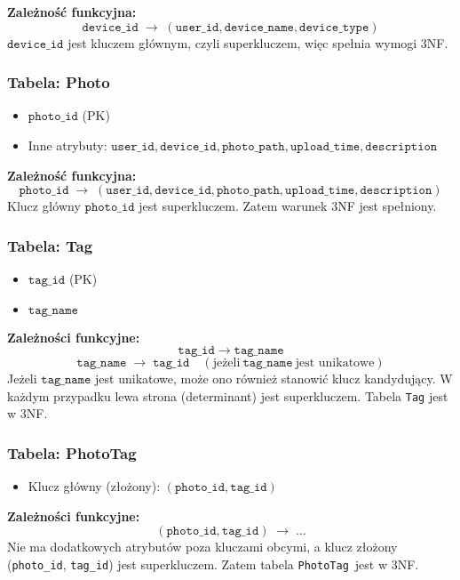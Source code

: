 \documentclass[12pt,a4paper]{article}
\begin{document}
\noindent \textbf{Zależność funkcyjna:}
\[
\texttt{device\_id} \;\rightarrow\; (\texttt{user\_id}, \texttt{device\_name}, \texttt{device\_type})
\]
\(\texttt{device\_id}\) jest kluczem głównym, czyli superkluczem, więc spełnia wymogi 3NF.

\subsubsection{Tabela: Photo}
\begin{itemize}
    \item \(\texttt{photo\_id}\) (PK)
    \item Inne atrybuty: \(\texttt{user\_id}, \texttt{device\_id}, \texttt{photo\_path}, \texttt{upload\_time}, \texttt{description}\)
\end{itemize}

\noindent \textbf{Zależność funkcyjna:}
\[
\texttt{photo\_id} \;\rightarrow\; (\texttt{user\_id}, \texttt{device\_id}, \texttt{photo\_path}, \texttt{upload\_time}, \texttt{description})
\]
Klucz główny \(\texttt{photo\_id}\) jest superkluczem. Zatem warunek 3NF jest spełniony.

\subsubsection{Tabela: Tag}
\begin{itemize}
    \item \(\texttt{tag\_id}\) (PK)
    \item \(\texttt{tag\_name}\)
\end{itemize}

\noindent \textbf{Zależności funkcyjne:}
\[
\texttt{tag\_id} \;\rightarrow\; \texttt{tag\_name}
\]
\[
\texttt{tag\_name} \;\rightarrow\; \texttt{tag\_id} \quad (\text{jeżeli} \ \texttt{tag\_name} \ \text{jest unikatowe})
\]
Jeżeli \(\texttt{tag\_name}\) jest unikatowe, może ono również stanowić klucz kandydujący. W każdym przypadku lewa strona (determinant) jest superkluczem. Tabela \texttt{Tag} jest w 3NF.

\subsubsection{Tabela: PhotoTag}
\begin{itemize}
    \item Klucz główny (złożony): \((\texttt{photo\_id}, \texttt{tag\_id})\)
\end{itemize}

\noindent \textbf{Zależności funkcyjne:}
\[
(\texttt{photo\_id}, \texttt{tag\_id}) \;\rightarrow\; \dots
\]
Nie ma dodatkowych atrybutów poza kluczami obcymi, a klucz złożony (\texttt{photo\_id}, \texttt{tag\_id}) jest superkluczem. Zatem tabela \texttt{PhotoTag}\ jest w 3NF.
\end{document}
